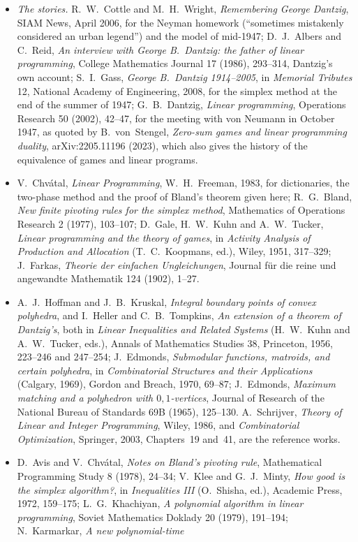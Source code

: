 \begin{itemize}
\item \emph{The stories.} R.~W.~Cottle and M.~H.~Wright, \emph{Remembering George Dantzig}, SIAM News, April 2006, for the Neyman homework (``sometimes mistakenly considered an urban legend'') and the model of mid-1947; D.~J.~Albers and C.~Reid, \emph{An interview with George B.~Dantzig: the father of linear
programming}, College Mathematics Journal 17 (1986), 293--314, Dantzig's own account; S.~I.~Gass, \emph{George B.~Dantzig 1914--2005}, in \emph{Memorial Tributes} 12, National Academy of Engineering, 2008, for the simplex method at the end of the summer of 1947; G.~B.~Dantzig,
\emph{Linear programming}, Operations Research 50 (2002), 42--47, for the meeting with von Neumann in October 1947, as quoted by B.~von~Stengel, \emph{Zero-sum games and linear programming duality}, arXiv:2205.11196 (2023), which also gives the history of the equivalence of games and linear programs.
\item V.~Chv\'atal, \emph{Linear Programming}, W.~H.~Freeman, 1983, for dictionaries, the two-phase method and the proof of Bland's theorem given here; R.~G.~Bland, \emph{New finite pivoting rules for the simplex method}, Mathematics of Operations Research 2 (1977), 103--107; D.~Gale, H.~W.~Kuhn and A.~W.~Tucker,
\emph{Linear programming and the theory of games}, in \emph{Activity Analysis of Production and Allocation} (T.~C.~Koopmans, ed.), Wiley, 1951, 317--329; J.~Farkas, \emph{Theorie der einfachen Ungleichungen}, Journal f\"ur die reine und angewandte Mathematik 124 (1902), 1--27.
\item A.~J.~Hoffman and J.~B.~Kruskal, \emph{Integral boundary points of convex polyhedra}, and I.~Heller and C.~B.~Tompkins, \emph{An extension of a theorem of Dantzig's}, both in \emph{Linear Inequalities and Related Systems} (H.~W.~Kuhn and A.~W.~Tucker, eds.), Annals of Mathematics Studies 38, Princeton, 1956,
223--246 and 247--254; J.~Edmonds, \emph{Submodular functions, matroids, and certain polyhedra}, in \emph{Combinatorial Structures and their Applications} (Calgary, 1969), Gordon and Breach, 1970, 69--87; J.~Edmonds, \emph{Maximum matching and a polyhedron with $0,1$-vertices}, Journal of Research of the National Bureau of
Standards 69B (1965), 125--130. A.~Schrijver, \emph{Theory of Linear and Integer Programming}, Wiley, 1986, and \emph{Combinatorial Optimization}, Springer, 2003, Chapters~19 and~41, are the reference works.
\item D.~Avis and V.~Chv\'atal, \emph{Notes on Bland's pivoting rule}, Mathematical Programming Study 8 (1978), 24--34; V.~Klee and G.~J.~Minty, \emph{How good is the simplex algorithm?}, in \emph{Inequalities III} (O.~Shisha, ed.), Academic Press, 1972, 159--175; L.~G.~Khachiyan, \emph{A polynomial algorithm in linear programming}, Soviet Mathematics Doklady 20 (1979), 191--194; N.~Karmarkar, \emph{A new polynomial-time
}
\end{itemize}
